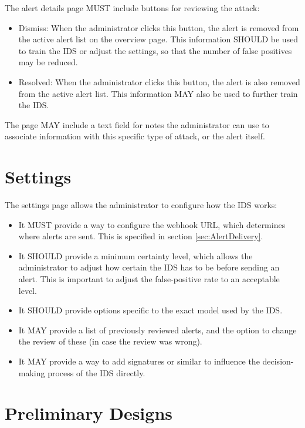 \documentclass[oneside, english]{reports/assets/sdqtechreport}
\begin{document}
The alert details page MUST include buttons for reviewing the attack:
\begin{itemize}
	\item Dismiss: When the administrator clicks this button, the alert is removed
	from the active alert list on the overview page. This information SHOULD be
	used to train the IDS or adjust the settings, so that the number of false
	positives may be reduced.
	\item Resolved: When the administrator clicks this button, the alert is
	also removed from the active alert list. This information MAY also be used to
	further train the IDS.
\end{itemize}

The page MAY include a text field for notes the administrator can use to
associate information with this specific type of attack, or the alert itself.

\section{Settings}
\label{sec:UserInterfaceSettings}

The settings page allows the administrator to configure how the IDS works:

\begin{itemize}
	\item It MUST provide a way to configure the webhook URL,
	which determines where alerts are sent. This is specified in section
	\ref{sec:AlertDelivery}.
	\item It SHOULD provide a minimum certainty level, which allows the
	administrator to adjust how certain the IDS has to be before sending an alert.
	This is important to adjust the false-positive rate to an acceptable level.
	\item It SHOULD provide options specific to the exact model used by the IDS.
	\item It MAY provide a list of previously reviewed alerts, and the option to
	change the review of these (in case the review was wrong).
	\item It MAY provide a way to add signatures or similar to influence the
	decision-making process of the IDS directly.
\end{itemize}

\section{Preliminary Designs}
\label{sec:UserInterfaceDesigns}
\end{document}
